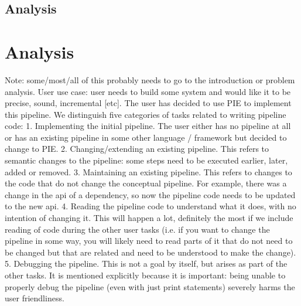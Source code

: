 
\subsection{Analysis}
\label{sec:evaluation__testing__analysis}


\section{Analysis}
\label{sec:evaluation__analysis}

Note: some/most/all of this probably needs to go to the introduction or problem analysis.
User use case: user needs to build some system and would like it to be precise, sound, incremental [etc]. The user has decided to use PIE to implement this pipeline.
We distinguish five categories of tasks related to writing pipeline code:
1. Implementing the initial pipeline. The user either has no pipeline at all or has an existing pipeline in some other language / framework but decided to change to PIE.
2. Changing/extending an existing pipeline. This refers to semantic changes to the pipeline: some steps need to be executed earlier, later, added or removed.
3. Maintaining an existing pipeline. This refers to changes to the code that do not change the conceptual pipeline. For example, there was a change in the api of a dependency, so now the pipeline code needs to be updated to the new api.
4. Reading the pipeline code to understand what it does, with no intention of changing it. This will happen a lot, definitely the most if we include reading of code during the other user tasks (i.e. if you want to change the pipeline in some way, you will likely need to read parts of it that do not need to be changed but that are related and need to be understood to make the change).
5. Debugging the pipeline. This is not a goal by itself, but arises as part of the other tasks. It is mentioned explicitly because it is important: being unable to properly debug the pipeline (even with just print statements) severely harms the user friendliness.



